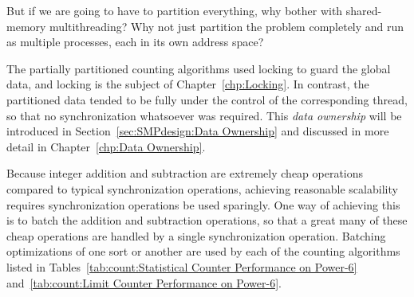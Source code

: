 \QuickQuiz{}
	But if we are going to have to partition everything, why bother
	with shared-memory multithreading?
	Why not just partition the problem completely and run as
	multiple processes, each in its own address space?
 \QuickQuizEnd

The partially partitioned counting algorithms used locking to
guard the global data, and locking is the subject of
Chapter~\ref{chp:Locking}.
In contrast, the partitioned data tended to be fully under the control of
the corresponding thread, so that no synchronization whatsoever was required.
This \emph{data ownership} will be introduced in
Section~\ref{sec:SMPdesign:Data Ownership}
and discussed in more detail in
Chapter~\ref{chp:Data Ownership}.

Because integer addition and subtraction are extremely cheap operations
compared to typical synchronization operations, achieving reasonable
scalability requires synchronization operations be used sparingly.
One way of achieving this is to batch the addition and subtraction
operations, so that a great many of these cheap operations are handled
by a single synchronization operation.
Batching optimizations of one sort or another are used by each of
the counting algorithms listed in
Tables~\ref{tab:count:Statistical Counter Performance on Power-6}
and~\ref{tab:count:Limit Counter Performance on Power-6}.

